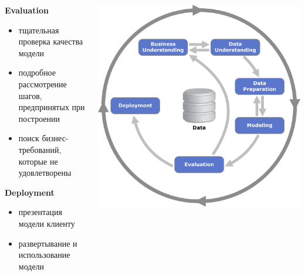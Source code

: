 \documentclass[aspectratio=169]{beamer}
\begin{document}
\begin{frame}{}

\begin{columns}
    \begin{column}{.7\textwidth}
		{\bf Evaluation}
		\begin{itemize}
		\item тщательная проверка качества модели
		\item подробное рассмотрение шагов, предпринятых при построении
		\item поиск бизнес-требований, которые не удовлетворены
		\end{itemize}
		
		\vspace{1em}

		{\bf Deployment}
		\begin{itemize}
		\item презентация модели клиенту
		\item развертывание и использование модели
		\end{itemize}
    \end{column}
    \begin{column}{.3\textwidth}
    \vspace{-0em}
		\begin{center}
   		\includegraphics[width=\textwidth]{images/crisp.png}
    \end{center}
    \end{column}
  \end{columns}

\end{frame}
\end{document}
